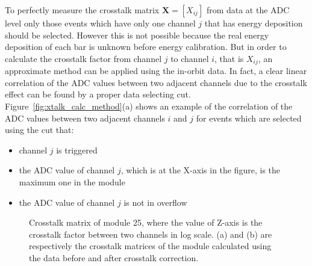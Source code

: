 \documentclass[preprint,sort&compress,12pt]{elsarticle}
\begin{document}
To perfectly measure the crosstalk matrix $\bm{X}=[X_{ij}]$ from data at the ADC level only those events which have only one channel $j$ that has energy deposition should be selected. However this is not possible because the real energy deposition of each bar is unknown before energy calibration. But in order to calculate the crosstalk factor from channel $j$ to channel $i$, that is $X_{ij}$, an approximate method can be applied using the in-orbit data. In fact, a clear linear correlation of the ADC values between two adjacent channels due to the crosstalk effect can be found by a proper data selecting cut. Figure~\ref{fig:xtalk_calc_method}(a) shows an example of the correlation of the ADC values between two adjacent channels $i$ and $j$ for events which are selected using the cut that:

\begin{itemize}
\item channel $j$ is triggered
\item the ADC value of channel $j$, which is at the X-axis in the figure, is the maximum one in the module
\item the ADC value of channel $j$ is not in overflow
\end{itemize}

\begin{figure}[!ht]
\centering
{}
\hspace{2mm}
\caption{Crosstalk matrix of module 25, where the value of Z-axis is the crosstalk factor between two channels in log scale. (a) and (b) are respectively the crosstalk matrices of the module calculated using the data before and after crosstalk correction.}\label{fig:crosstalk_matrix}
\end{figure}
\end{document}

